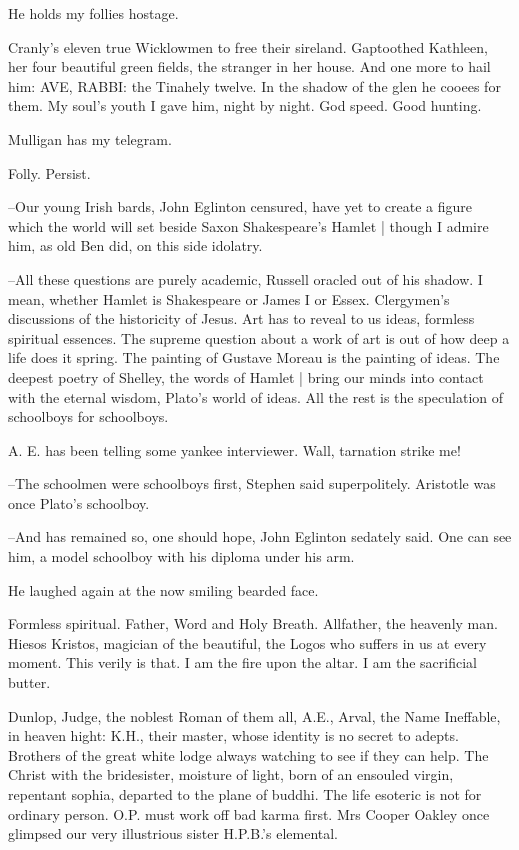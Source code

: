 He holds my follies hostage.

Cranly's eleven true Wicklowmen to free their sireland.
Gaptoothed Kathleen,
her four beautiful green fields,
the stranger in her house.
And one more to hail him:
AVE, RABBI:
the Tinahely twelve.
In the shadow of the glen he cooees for them.
My soul's youth I gave him, night by night.
God speed.
Good hunting.

Mulligan has my telegram.

Folly. Persist.

--Our young Irish bards,
John Eglinton censured,
have yet to create a figure
which the world will set beside Saxon Shakespeare's Hamlet |
though I admire him,
as old Ben did,
on this side idolatry.

--All these questions are purely academic,
Russell oracled out of his shadow.
I mean, whether Hamlet is Shakespeare or James I or Essex.
Clergymen's discussions of the historicity of Jesus.
Art has to reveal to us ideas,
formless spiritual essences.
The supreme question about a work of art is out of how deep a life does it spring.
The painting of Gustave Moreau is the painting of ideas.
The deepest poetry of Shelley,
the words of Hamlet |
bring our minds into contact with the eternal wisdom,
Plato's world of ideas.
All the rest is the speculation of schoolboys for schoolboys.

A. E. has been telling some yankee interviewer.
Wall, tarnation strike me!

--The schoolmen were schoolboys first,
Stephen said superpolitely.
Aristotle was once Plato's schoolboy.

--And has remained so,
one should hope,
John Eglinton sedately said.
One can see him,
a model schoolboy with his diploma under his arm.

He laughed again at the now smiling bearded face.

Formless spiritual.
Father, Word and Holy Breath.
Allfather, the heavenly man.
Hiesos Kristos, magician of the beautiful,
the Logos who suffers in us at every moment.
This verily is that.
I am the fire upon the altar.
I am the sacrificial butter.

Dunlop,
Judge,
the noblest Roman of them all,
A.E.,
Arval,
the Name Ineffable,
in heaven hight:
K.H., their master,
whose identity is no secret to adepts.
Brothers of the great white lodge always watching to see if they can help.
The Christ with the bridesister,
moisture of light,
born of an ensouled virgin,
repentant sophia,
departed to the plane of buddhi.
The life esoteric is not for ordinary person.
O.P. must work off bad karma first.
Mrs Cooper Oakley once glimpsed our very illustrious sister H.P.B.'s elemental.

